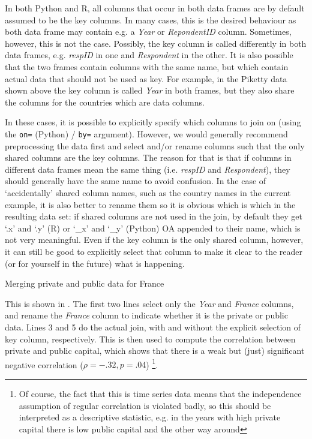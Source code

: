 In both Python and R, all columns that occur in both data frames are by default assumed to be the key columns.
In many cases, this is the desired behaviour as both data frame may contain e.g. a \emph{Year} or \emph{RepondentID} column.
Sometimes, however, this is not the case.
Possibly, the key column is called differently in both data frames, e.g. \emph{respID} in one and \emph{Respondent} in the other. 
It is also possible that the two frames contain columns with the same name,
but which contain actual data that should not be used as key.
For example, in the Piketty data shown above the key column is called \emph{Year} in both frames,
but they also share the columns for the countries which are data columns.

In these cases, it is possible to explicitly specify which columns to join on (using the \verb+on=+ (Python) / \verb+by=+ argument).
However, we would generally recommend preprocessing the data first and select and/or rename columns such that the only shared columns are the key columns.
The reason for that is that if columns in different data frames mean the same thing (i.e. \emph{respID} and \emph{Respondent}), they should generally have the same name to avoid confusion.
In the case of `accidentally' shared column names, such as the country names in the current example,
it is also better to rename them so it is obvious which is which in the resulting data set:
if shared columns are not used in the join, by default they get `.x' and `.y' (R) or `\_x' and `\_y' (Python) OA appended to their name, which is not very meaningful.
Even if the key column is the only shared column, however, it can still be good to explicitly select that column to make it clear to the reader (or for yourself in the future) what is happening. 

\begin{ccsexample}
\caption{Merging private and public data for France}\label{ex:merge}
\end{ccsexample}



This is shown in .
The first two lines select only the \emph{Year} and \emph{France} columns, and rename the \emph{France} column to indicate whether it is the private or public data.
Lines 3 and 5 do the actual join, with and without the explicit selection of key column, respectively.
This is then used to compute the correlation between private and public capital, 
which shows that there is a weak but (just) significant negative correlation ($\rho=-.32, p=.04$)%
\footnote{Of course, the fact that this is time series data means that the independence assumption of regular correlation is violated badly, so this should be interpreted as a descriptive statistic, e.g. in the years with high private capital there is low public capital and the other way around}.

